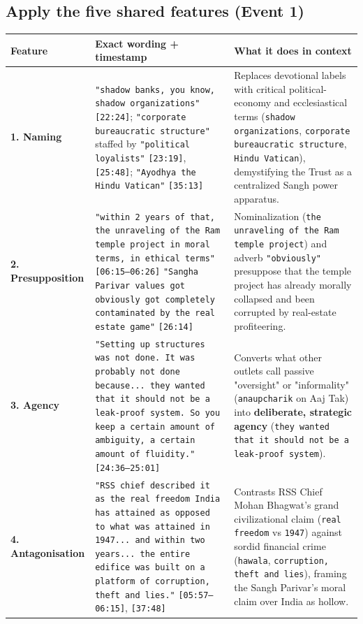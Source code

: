 \documentclass[10pt,a4paper]{article}
\begin{document}
\subsection*{Apply the five shared features (Event 1)}
\begin{longtable}{@{}>{\raggedright\arraybackslash}p{} >{\raggedright\arraybackslash}p{} >{\raggedright\arraybackslash}p{}@{}}
\toprule
\textbf{Feature} & \textbf{Exact wording + timestamp} & \textbf{What it does in context} \\
\midrule
\endhead
\textbf{1. Naming} & \texttt{"shadow banks, you know, shadow organizations"} \texttt{[22:24]}; \texttt{"corporate bureaucratic structure"} staffed by \texttt{"political loyalists"} \texttt{[23:19]}, \texttt{[25:48]}; \texttt{"Ayodhya the Hindu Vatican"} \texttt{[35:13]} & Replaces devotional labels with critical political-economy and ecclesiastical terms (\texttt{shadow organizations}, \texttt{corporate bureaucratic structure}, \texttt{Hindu Vatican}), demystifying the Trust as a centralized Sangh power apparatus. \\
\addlinespace[4pt]
\textbf{2. Presupposition} & \texttt{"within 2 years of that, the unraveling of the Ram temple project in moral terms, in ethical terms"} \texttt{[06:15--06:26]} \newline  \texttt{"Sangha Parivar values got obviously got completely contaminated by the real estate game"} \texttt{[26:14]} & Nominalization (\texttt{the unraveling of the Ram temple project}) and adverb \texttt{"obviously"} presuppose that the temple project has already morally collapsed and been corrupted by real-estate profiteering. \\
\addlinespace[4pt]
\textbf{3. Agency} & \texttt{"Setting up structures was not done. It was probably not done because... they wanted that it should not be a leak-proof system. So you keep a certain amount of ambiguity, a certain amount of fluidity."} \texttt{[24:36--25:01]} & Converts what other outlets call passive "oversight" or "informality" (\texttt{anaupcharik} on Aaj Tak) into \textbf{deliberate, strategic agency} (\texttt{they wanted that it should not be a leak-proof system}). \\
\addlinespace[4pt]
\textbf{4. Antagonisation} & \texttt{"RSS chief described it as the real freedom India has attained as opposed to what was attained in 1947... and within two years... the entire edifice was built on a platform of corruption, theft and lies."} \texttt{[05:57--06:15]}, \texttt{[37:48]} & Contrasts RSS Chief Mohan Bhagwat's grand civilizational claim (\texttt{real freedom} vs \texttt{1947}) against sordid financial crime (\texttt{hawala}, \texttt{corruption, theft and lies}), framing the Sangh Parivar's moral claim over India as hollow. \\

\end{longtable}
\end{document}

